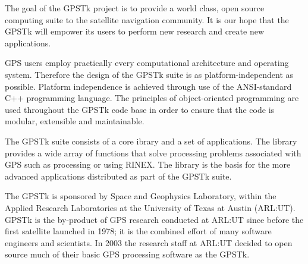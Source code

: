 The goal of the GPSTk project is to provide a world class, open source computing suite to the satellite navigation community. It is our hope that the GPSTk will empower its users to perform new research and create new applications.

GPS users employ practically every computational architecture and operating system. Therefore the design of the GPSTk suite is as platform-independent as possible. Platform independence is achieved through use of the ANSI-standard C++ programming language. The principles of object-oriented programming are used throughout the GPSTk code base in order to ensure that the code is modular, extensible and maintainable.

The GPSTk suite consists of a core ibrary and a set of applications. The library provides a wide array of functions that solve processing problems associated with GPS such as processing or using RINEX. The library is the basis for the more advanced applications distributed as part of the GPSTk suite.

The GPSTk is sponsored by Space and Geophysics Laboratory, within the Applied Research Laboratories at the University of Texas at Austin (ARL:UT). GPSTk is the by-product of GPS research conducted at ARL:UT since before the first satellite launched in 1978; it is the combined effort of many software engineers and scientists. In 2003 the research staff at ARL:UT decided to open source much of their basic GPS processing software as the GPSTk.
